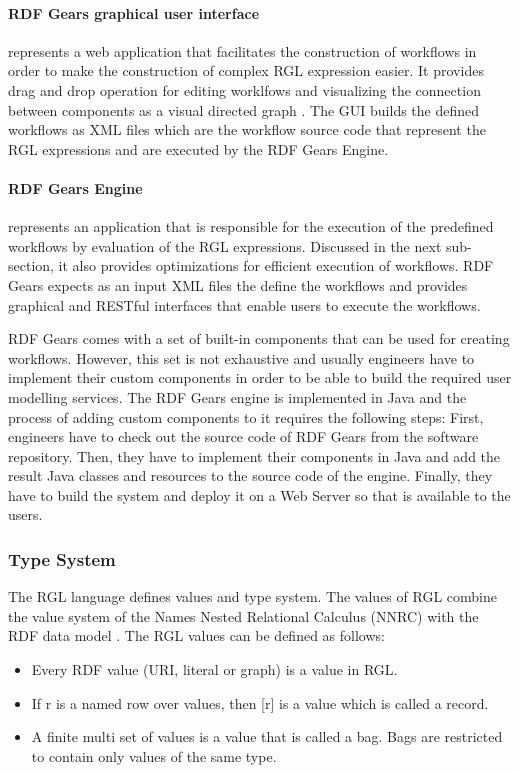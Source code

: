 \paragraph{RDF Gears graphical user interface} represents a web application that facilitates the construction of workflows in order to make the construction of complex RGL expression easier. It provides drag and drop operation for editing worklfows and visualizing the connection between components as a visual directed graph \cite{Marojahan}. The GUI builds the defined workflows as XML files which are the workflow source code that represent the RGL expressions and are executed by the RDF Gears Engine.

\paragraph{RDF Gears Engine} represents an application that is responsible for the execution of the predefined workflows by evaluation of the RGL expressions. Discussed in the next sub-section, it also provides optimizations for efficient execution of workflows. RDF Gears expects as an input XML files the define the workflows and provides graphical and RESTful interfaces that enable users to execute the workflows. 

RDF Gears comes with a set of built-in components that can be used for creating workflows. However, this set is not exhaustive and usually engineers have to implement their custom components in order to be able to build the required user modelling services. The RDF Gears engine is implemented in Java and the process of adding custom components to it requires the following steps: First, engineers have to check out the source code of RDF Gears from the software repository. Then, they have to implement their components in Java and add the result Java classes and resources to the source code of the engine.  Finally, they have to build the system and deploy it on a Web Server so that is available to the users.

\subsubsection{Type System}

The RGL language defines values and type system. The values of RGL combine the value system of the Names Nested Relational Calculus (NNRC) with the RDF data model \cite{Feliksik11}. The RGL values can be defined as follows:

\begin{itemize}
	\item Every RDF value (URI, literal or graph) is a value in RGL.
	
	\item If r is a named row over values, then [r] is a value which is called a record.
	
	\item A finite multi set of values is a value that is called a bag. Bags are restricted to contain only values of the same type.
\end{itemize}

